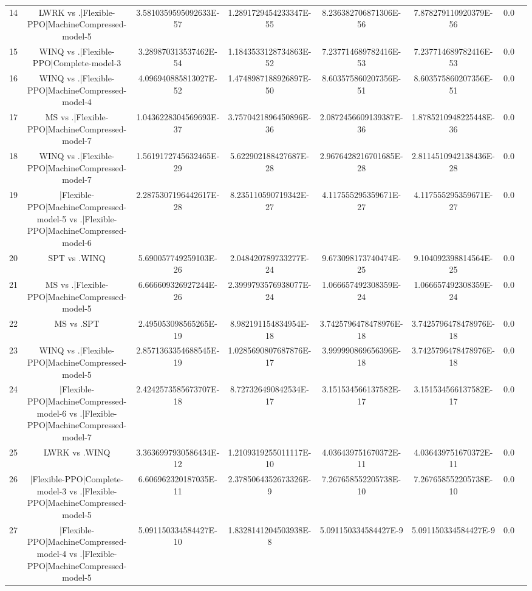 \documentclass[a3paper,10pt]{article}
\begin{document}
\begin{table}[!htp]
\begin{tabular}{cccccccc}
14&LWRK vs .|Flexible-PPO|MachineCompressed-model-5&3.5810359595092633E-57&1.2891729454233347E-55&8.236382706871306E-56&7.878279110920379E-56&0.0\\
15&WINQ vs .|Flexible-PPO|Complete-model-3&3.289870313537462E-54&1.1843533128734863E-52&7.237714689782416E-53&7.237714689782416E-53&0.0\\
16&WINQ vs .|Flexible-PPO|MachineCompressed-model-4&4.096940885813027E-52&1.4748987188926897E-50&8.603575860207356E-51&8.603575860207356E-51&0.0\\
17&MS vs .|Flexible-PPO|MachineCompressed-model-7&1.0436228304569693E-37&3.7570421896450896E-36&2.0872456609139387E-36&1.8785210948225448E-36&0.0\\
18&WINQ vs .|Flexible-PPO|MachineCompressed-model-7&1.5619172745632465E-29&5.622902188427687E-28&2.9676428216701685E-28&2.8114510942138436E-28&0.0\\
19&|Flexible-PPO|MachineCompressed-model-5 vs .|Flexible-PPO|MachineCompressed-model-6&2.2875307196442617E-28&8.235110590719342E-27&4.117555295359671E-27&4.117555295359671E-27&0.0\\
20&SPT vs .WINQ&5.690057749259103E-26&2.048420789733277E-24&9.673098173740474E-25&9.104092398814564E-25&0.0\\
21&MS vs .|Flexible-PPO|MachineCompressed-model-5&6.666609326927244E-26&2.3999793576938077E-24&1.066657492308359E-24&1.066657492308359E-24&0.0\\
22&MS vs .SPT&2.495053098565265E-19&8.982191154834954E-18&3.7425796478478976E-18&3.7425796478478976E-18&0.0\\
23&WINQ vs .|Flexible-PPO|MachineCompressed-model-5&2.8571363354688545E-19&1.0285690807687876E-17&3.999990869656396E-18&3.7425796478478976E-18&0.0\\
24&|Flexible-PPO|MachineCompressed-model-6 vs .|Flexible-PPO|MachineCompressed-model-7&2.4242573585673707E-18&8.727326490842534E-17&3.151534566137582E-17&3.151534566137582E-17&0.0\\
25&LWRK vs .WINQ&3.3636997930586434E-12&1.2109319255011117E-10&4.036439751670372E-11&4.036439751670372E-11&0.0\\
26&|Flexible-PPO|Complete-model-3 vs .|Flexible-PPO|MachineCompressed-model-5&6.606962320187035E-11&2.3785064352673326E-9&7.267658552205738E-10&7.267658552205738E-10&0.0\\
27&|Flexible-PPO|MachineCompressed-model-4 vs .|Flexible-PPO|MachineCompressed-model-5&5.091150334584427E-10&1.8328141204503938E-8&5.091150334584427E-9&5.091150334584427E-9&0.0\\

\end{tabular}
\end{table}
\end{document}
